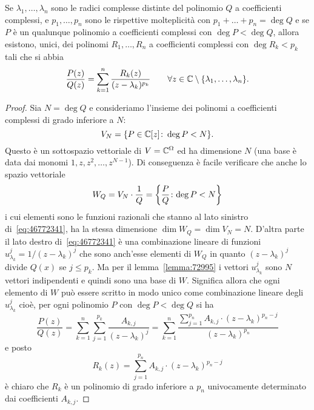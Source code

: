 \begin{theorem}
\label{th:fratti_semplici_complessi}%
%
%
%
Se $\lambda_1, \dots, \lambda_n$ sono le radici complesse
distinte del polinomio $Q$ a coefficienti complessi,
e $p_1,\dots, p_n$ sono le rispettive molteplicità
con $p_1 + \dots + p_n = \deg Q$
e se $P$ è un qualunque polinomio a coefficienti complessi
con $\deg P < \deg Q$,
allora esistono, unici, dei polinomi $R_1, \dots, R_n$
a coefficienti complessi con $\deg R_k < p_k$ tali che
si abbia
\begin{equation}\label{eq:46772341}
  \frac{P(z)}{Q(z)}
  = \sum_{k=1}^n \frac{R_k(z)}{(z-\lambda_k)^{p_k}}
  \qquad \forall z \in \mathbb C\setminus{\left\{ \lambda_1,\dots,\lambda_n \right\}}.
\end{equation}
\end{theorem}
%
\begin{proof}
Sia $N=\deg Q$ e consideriamo
l'insieme dei polinomi a coefficienti complessi
di grado inferiore a $N$:
\[
  V_N = {\left\{ P\in \mathbb C[z]\colon \deg P < N \right\}}.
\]
Questo è un sottospazio vettoriale di
$V=\mathbb C^\Omega$ ed ha dimensione
$N$ (una base è data dai monomi $1, z, z^2, \dots, z^{N-1}$).
Di conseguenza è facile verificare che anche lo spazio vettoriale
\[
  W_Q = V_N \cdot \frac{1}{Q} = {\left\{ \frac{P}{Q}\colon \text{$\deg P < N$} \right\}}
\]
i cui elementi sono le funzioni razionali che stanno al lato sinistro
di~\eqref{eq:46772341},
ha la stessa dimensione $\dim W_Q = \dim V_N = N$.
D'altra parte il lato destro di~\eqref{eq:46772341}
è una combinazione lineare di funzioni
$u_{\lambda_k}^j = 1/(z-\lambda_k)^j$ che sono
anch'esse elementi di $W_Q$ in quanto $(z-\lambda_k)^j$ divide $Q(x)$
se $j\le p_k$.
Ma per il lemma~\ref{lemma:72995} i vettori $u_{\lambda_k}^j$ sono
$N$ vettori indipendenti e quindi
sono una base di $W$.
Significa allora che ogni elemento di $W$ può
essere scritto in modo unico come combinazione lineare degli
$u_{\lambda_k}^j$ cioè, per ogni
polinomio $P$ con $\deg P < \deg Q$ si ha
\begin{equation}\label{eq:458934}
 \frac{P(z)}{Q(z)}
 = \sum_{k=1}^n \sum_{j=1}^{p_k} \frac{A_{k,j}}{(z-\lambda_k)^j}
 = \sum_{k=1}^n \frac{\displaystyle \sum_{j=1}^{p_n} A_{k,j}\cdot (z-\lambda_k)^{p_n-j}}{(z-\lambda_k)^{p_n}}
\end{equation}
e posto
\[
  R_k(z) = \sum_{j=1}^{p_n} A_{k,j}\cdot(z-\lambda_k)^{p_n-j}
\]
è chiaro che $R_k$ è un polinomio di grado inferiore a $p_n$
univocamente determinato dai coefficienti $A_{k,j}$.
\end{proof}


